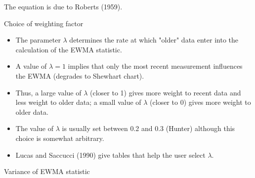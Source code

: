 ﻿\documentclass[Charts101.tex]{subfiles}
\begin{document}
\begin{frame}
\begin{frame}
\begin{frame}
\begin{frame}
\begin{frame}
\begin{frame}
The equation is due to Roberts (1959).
\end{frame}
\begin{frame}

Choice of weighting factor	
\begin{itemize}
\item The parameter $\lambda$ determines the rate at which "older" data enter into the calculation of the EWMA statistic. 
\item A value of $\lambda=1$ implies that only the most recent measurement influences the EWMA (degrades to Shewhart chart). 
\item Thus, a large value of $\lambda$ (closer to 1) gives more weight to recent data and less weight to older data; a small value of $\lambda$ (closer to 0) gives more weight to older data. 
\item The value of $\lambda$ is usually set between 0.2 and 0.3 (Hunter) although this choice is somewhat arbitrary. 
\item Lucas and Saccucci (1990) give tables that help the user select $\lambda$.
\end{itemize}
\end{frame}
\begin{frame}
Variance of EWMA statistic	

\end{frame}
\end{frame}
\end{frame}
\end{frame}
\end{frame}
\end{frame}
\end{document}
